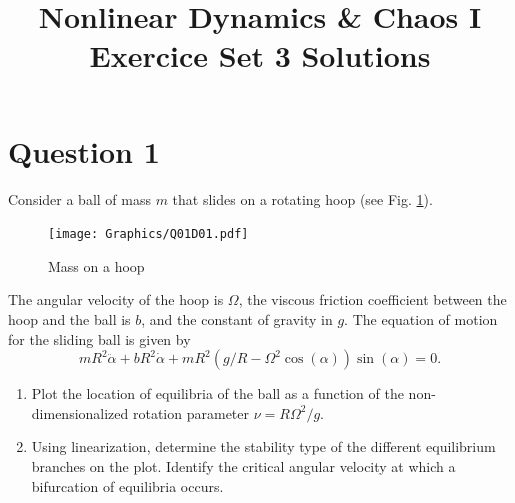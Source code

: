 \documentclass[twoside,10pt,a4paper]{article}
\title{\huge \textbf{Nonlinear Dynamics \& Chaos I \\ \Large Exercice Set 3 Solutions}}	%
\author{ }		%
\date{ }	%
\begin{document}
\maketitle

\section*{Question 1}
Consider a ball of mass $m$ that slides on a rotating hoop (see Fig. \ref{Q01D01}).

\begin{figure}[H]
	\centering
	\texttt{[image: Graphics/Q01D01.pdf]}
	\caption{Mass on a hoop}
	\label{Q01D01}
\end{figure}
The angular velocity of the hoop is $\Omega$, the viscous friction coefficient between the hoop and the ball is $b$, and the constant of gravity in $g$. The equation of motion for the sliding ball is given by
\begin{equation*}
	mR^2 \ddot{\alpha} + bR^2 \dot{\alpha} + mR^2(g/R - \Omega^2 \cos(\alpha)) \sin(\alpha) = 0.
\end{equation*}
\begin{enumerate}[label=(\alph*)]
	\item Plot the location of equilibria of the ball as a function of the non-dimensionalized rotation parameter $\nu = R\Omega^2 /g$.
	\item Using linearization, determine the stability type of the different equilibrium branches on the plot. Identify the critical angular velocity at which a bifurcation of equilibria occurs.
\end{enumerate}
\end{document}
